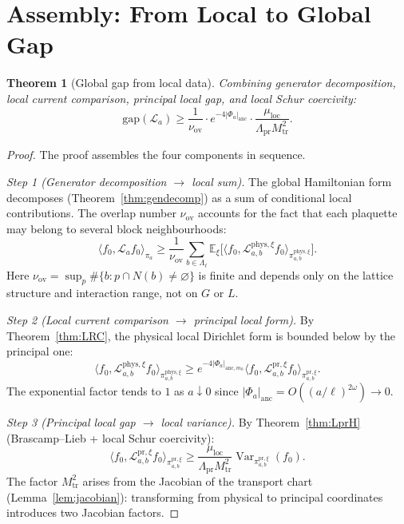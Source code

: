 \documentclass[12pt]{article}
\theoremstyle{plain}
\newtheorem{theorem}{Theorem}[section]
\theoremstyle{definition}
\numberwithin{equation}{section}
\newcommand{\Var}{\operatorname{Var}}
\newcommand{\pr}{\mathrm{pr}}
\newcommand{\phys}{\mathrm{phys}}
\newcommand{\loc}{\mathrm{loc}}
\newcommand{\ov}{\mathrm{ov}}
\newcommand{\tr}{\mathrm{tr}}
\begin{document}
\section{Assembly: From Local to Global Gap}\label{sec:assembly}

\begin{theorem}[Global gap from local data]\label{thm:globalgap}
Combining generator decomposition, local current comparison, principal local gap, and local Schur coercivity:
\begin{equation}
\mathrm{gap}(\mathcal{L}_a) \geq \frac{1}{\nu_{\ov}}\cdot e^{-4|\Phi_a|_{\mathrm{anc}}}\cdot\frac{\mu_{\loc}}{\Lambda_{\pr}M_{\tr}^2}.
\end{equation}
\end{theorem}

\begin{proof}
The proof assembles the four components in sequence.

\emph{Step 1 (Generator decomposition $\to$ local sum).}
The global Hamiltonian form decomposes (Theorem~\ref{thm:gendecomp}) as a sum of conditional local contributions.  The overlap number $\nu_{\ov}$ accounts for the fact that each plaquette may belong to several block neighbourhoods:
\begin{equation}
\langle f_0,\mathcal{L}_a f_0\rangle_{\pi_a} \geq \frac{1}{\nu_{\ov}}\sum_{b\in\Lambda_\ell}\mathbb{E}_\xi\bigl[\langle f_0,\mathcal{L}_{a,b}^{\phys,\xi}f_0\rangle_{\pi_{a,b}^{\phys,\xi}}\bigr].
\end{equation}
Here $\nu_{\ov}=\sup_p\#\{b:p\cap N(b)\neq\varnothing\}$ is finite and depends only on the lattice structure and interaction range, not on $G$ or $L$.

\emph{Step 2 (Local current comparison $\to$ principal local form).}
By Theorem~\ref{thm:LRC}, the physical local Dirichlet form is bounded below by the principal one:
\begin{equation}
\langle f_0,\mathcal{L}_{a,b}^{\phys,\xi}f_0\rangle_{\pi_{a,b}^{\phys,\xi}} \geq e^{-4|\Phi_a|_{\mathrm{anc},m_0}}\langle f_0,\mathcal{L}_{a,b}^{\pr,\xi}f_0\rangle_{\pi_{a,b}^{\pr,\xi}}.
\end{equation}
The exponential factor tends to $1$ as $a\downarrow 0$ since $|\Phi_a|_{\mathrm{anc}}=O((a/\ell)^{2\omega})\to 0$.

\emph{Step 3 (Principal local gap $\to$ local variance).}
By Theorem~\ref{thm:LprH} (Brascamp--Lieb + local Schur coercivity):
\begin{equation}
\langle f_0,\mathcal{L}_{a,b}^{\pr,\xi}f_0\rangle_{\pi_{a,b}^{\pr,\xi}} \geq \frac{\mu_{\loc}}{\Lambda_{\pr}M_{\tr}^2}\Var_{\pi_{a,b}^{\pr,\xi}}(f_0).
\end{equation}
The factor $M_{\tr}^2$ arises from the Jacobian of the transport chart (Lemma~\ref{lem:jacobian}): transforming from physical to principal coordinates introduces two Jacobian factors.


\end{proof}
\end{document}

